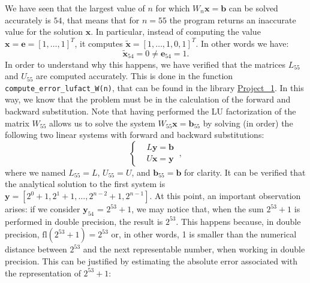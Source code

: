 \documentclass[a4paper,11pt]{article}
\begin{document}
\noindent We have seen that the largest value of $n$ for which $W_n \textbf{x} = \textbf{b}$ can be solved accurately is $54$, that means that for $n=55$ the program returns an inaccurate value for the solution $\textbf{x}$. In particular, instead of computing the value $\textbf{x} = \textbf{e} = [1,\dots,1]^T$, it computes $\tilde{\textbf{x}} = [1,\dots,1,0,1]^T$. In other words we have:
\begin{equation}\label{key}
	\tilde{\textbf{x}}_{54} = 0 \neq \textbf{e}_{54} = 1.
\end{equation}
In order to understand why this happens, we have verified that the matrices $L_{55}$ and $U_{55}$ are computed accurately. This is done in the function \texttt{compute_error_lufact_W(n)}, that can be found in the library \href{https://github.com/nunziacerrato/Numerical_Analysis_Optimization/blob/main/Project_1/Project_1.py}{Project\_1}. In this way, we know that the problem must be in the calculation of the forward and backward substitution. Note that having performed the LU factorization of the matrix $W_{55}$ allows us to solve the system $W_{55} \textbf{x} = \textbf{b}_{55}$ by solving (in order) the following two linear systems with forward and backward substitutions:
\begin{equation}\label{key}
	\left\lbrace \begin{split}
		& L \textbf{y} = \textbf{b} \\
		& U \textbf{x} = \textbf{y}
	\end{split} \right. \ ,
\end{equation}
where we named $L_{55} = L$, $U_{55} = U$, and $\textbf{b}_{55} = \textbf{b}$ for clarity.
It can be verified that the analytical solution to the first system is $\textbf{y} = [2^0 + 1, 2^1 + 1, \dots,2^{n-2}+1, 2^{n-1}]$. At this point, an important observation arises: if we consider $\textbf{y}_{54}$ = $2^{53} + 1 $, we may notice that, when the sum $2^{53} + 1$ is performed in double precision, the result is $2^{53}$. This happens because, in double precision, $\text{fl}(2^{53}+1)=2^{53}$ or, in other words, 1 is smaller than the numerical distance between $2^{53}$ and the next representable number, when working in double precision. This can be justified by estimating the absolute error associated with the representation of $2^{53}+1$:
\end{document}
